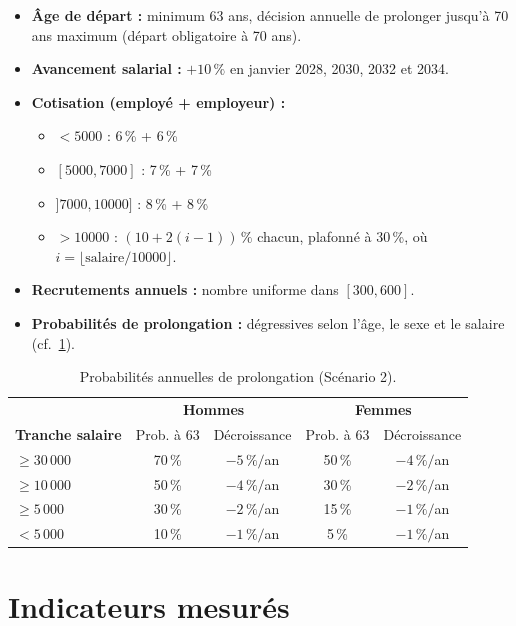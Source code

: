 \documentclass[12pt,a4paper,oneside]{report}
\begin{document}
\begin{itemize}
  \item \textbf{Âge de départ :} minimum 63 ans, décision annuelle de
        prolonger jusqu'à 70 ans maximum (départ obligatoire à 70 ans).
  \item \textbf{Avancement salarial :} $+10\,\%$ en janvier 2028, 2030,
        2032 et 2034.
  \item \textbf{Cotisation (employé + employeur) :}
        \begin{itemize}
          \item $< 5000$ : 6\,\% + 6\,\%
          \item $[5000, 7000]$ : 7\,\% + 7\,\%
          \item $]7000, 10000]$ : 8\,\% + 8\,\%
          \item $> 10000$ : $(10 + 2(i-1))\,\%$ chacun, plafonné à
                30\,\%, où $i = \lfloor \text{salaire}/10000 \rfloor$.
        \end{itemize}
  \item \textbf{Recrutements annuels :} nombre uniforme dans $[300, 600]$.
  \item \textbf{Probabilités de prolongation :} dégressives selon
        l'âge, le sexe et le salaire (cf.~\cref{tab:prolong}).
\end{itemize}

\begin{table}[H]
\centering
\caption{Probabilités annuelles de prolongation (Scénario 2).}
\label{tab:prolong}
\begin{tabular}{lcc|cc}
\toprule
 & \multicolumn{2}{c|}{\textbf{Hommes}} &
   \multicolumn{2}{c}{\textbf{Femmes}} \\
\textbf{Tranche salaire} & Prob. à 63 & Décroissance &
                          Prob. à 63 & Décroissance \\
\midrule
$\geq 30\,000$        & 70\,\% & $-5\,\%/$an & 50\,\% & $-4\,\%/$an \\
$\geq 10\,000$        & 50\,\% & $-4\,\%/$an & 30\,\% & $-2\,\%/$an \\
$\geq 5\,000$         & 30\,\% & $-2\,\%/$an & 15\,\% & $-1\,\%/$an \\
$<  5\,000$           & 10\,\% & $-1\,\%/$an &  5\,\% & $-1\,\%/$an \\
\bottomrule
\end{tabular}
\end{table}

\section{Indicateurs mesurés}
\end{document}
